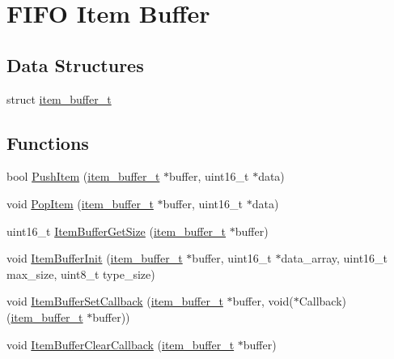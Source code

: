 \hypertarget{group__item__buffer}{}\section{F\+I\+F\+O Item Buffer}
\label{group__item__buffer}
\subsection*{Data Structures}
\begin{DoxyCompactItemize}
\item 
struct \hyperlink{structitem__buffer__t}{item\+\_\+buffer\+\_\+t}
\end{DoxyCompactItemize}
\subsection*{Functions}
\begin{DoxyCompactItemize}
\item 
bool \hyperlink{group__item__buffer_ga1bc23d65759a35a5c79d2a1330564d5a}{Push\+Item} (\hyperlink{structitem__buffer__t}{item\+\_\+buffer\+\_\+t} $\ast$buffer, uint16\+\_\+t $\ast$data)
\item 
void \hyperlink{group__item__buffer_ga77317789d2a005ff6db3c952ab2b5b90}{Pop\+Item} (\hyperlink{structitem__buffer__t}{item\+\_\+buffer\+\_\+t} $\ast$buffer, uint16\+\_\+t $\ast$data)
\item 
uint16\+\_\+t \hyperlink{group__item__buffer_ga7edfdec60fea24b3204c4a6e3efa14f7}{Item\+Buffer\+Get\+Size} (\hyperlink{structitem__buffer__t}{item\+\_\+buffer\+\_\+t} $\ast$buffer)
\item 
void \hyperlink{group__item__buffer_ga7f98743fe5f0c2d614eefd4d473fd2fd}{Item\+Buffer\+Init} (\hyperlink{structitem__buffer__t}{item\+\_\+buffer\+\_\+t} $\ast$buffer, uint16\+\_\+t $\ast$data\+\_\+array, uint16\+\_\+t max\+\_\+size, uint8\+\_\+t type\+\_\+size)
\item 
void \hyperlink{group__item__buffer_ga6f81726387a262fa35a4ea4b0f2d7998}{Item\+Buffer\+Set\+Callback} (\hyperlink{structitem__buffer__t}{item\+\_\+buffer\+\_\+t} $\ast$buffer, void($\ast$Callback)(\hyperlink{structitem__buffer__t}{item\+\_\+buffer\+\_\+t} $\ast$buffer))
\item 
void \hyperlink{group__item__buffer_ga14ad34083103e53b491ba9891f5e771d}{Item\+Buffer\+Clear\+Callback} (\hyperlink{structitem__buffer__t}{item\+\_\+buffer\+\_\+t} $\ast$buffer)
\end{DoxyCompactItemize}


